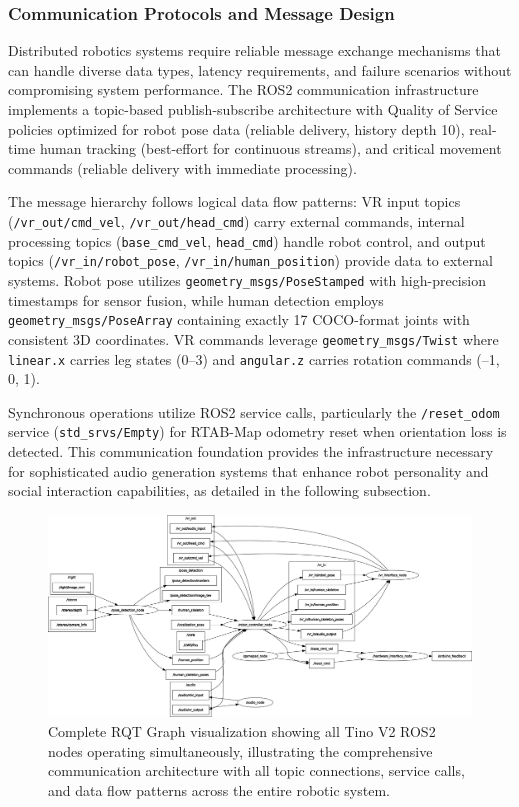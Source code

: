\subsubsection{Communication Protocols and Message Design}

Distributed robotics systems require reliable message exchange mechanisms that can handle diverse data types, latency requirements, and failure scenarios without compromising system performance. The ROS2 communication infrastructure implements a topic-based publish-subscribe architecture with Quality of Service policies optimized for robot pose data (reliable delivery, history depth 10), real-time human tracking (best-effort for continuous streams), and critical movement commands (reliable delivery with immediate processing).

The message hierarchy follows logical data flow patterns: VR input topics (\texttt{/vr\_out/cmd\_vel}, \texttt{/vr\_out/head\_cmd}) carry external commands, internal processing topics (\texttt{base\_cmd\_vel}, \texttt{head\_cmd}) handle robot control, and output topics (\texttt{/vr\_in/robot\_pose}, \texttt{/vr\_in/human\_position}) provide data to external systems. Robot pose utilizes \texttt{geometry\_msgs/PoseStamped} with high-precision timestamps for sensor fusion, while human detection employs \texttt{geometry\_msgs/PoseArray} containing exactly 17 COCO-format joints with consistent 3D coordinates. VR commands leverage \texttt{geometry\_msgs/Twist} where \texttt{linear.x} carries leg states (0--3) and \texttt{angular.z} carries rotation commands (--1, 0, 1).

Synchronous operations utilize ROS2 service calls, particularly the \texttt{/reset\_odom} service (\texttt{std\_srvs/Empty}) for RTAB-Map odometry reset when orientation loss is detected. This communication foundation provides the infrastructure necessary for sophisticated audio generation systems that enhance robot personality and social interaction capabilities, as detailed in the following subsection.

\begin{figure}[H]
    \centering
    \includegraphics[width=\textwidth]{Images/fulltinonodes.png}
    \caption{Complete RQT Graph visualization showing all Tino V2 ROS2 nodes operating simultaneously, illustrating the comprehensive communication architecture with all topic connections, service calls, and data flow patterns across the entire robotic system.}
    \label{fig:rqt_complete_system}
\end{figure}

